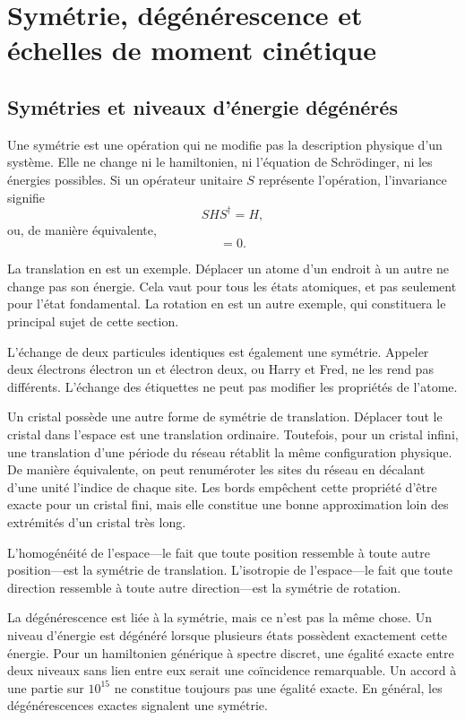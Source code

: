 \chapter{Symétrie, dégénérescence et échelles de moment cinétique}
\providecommand{\ket}[1]{\left\lvert#1\right\rangle}

\section{Symétries et niveaux d’énergie dégénérés}

Une symétrie est une opération qui ne modifie pas la description physique d’un système. Elle ne change ni le hamiltonien, ni l’équation de Schr\"odinger, ni les énergies possibles. Si un opérateur unitaire \(S\) représente l’opération, l’invariance signifie
\begin{equation}
S H S^\dagger=H,
\end{equation}
ou, de manière équivalente,
\begin{equation}
[S,H]=0.
\end{equation}

La translation en est un exemple. Déplacer un atome d’un endroit à un autre ne change pas son énergie. Cela vaut pour tous les états atomiques, et pas seulement pour l’état fondamental. La rotation en est un autre exemple, qui constituera le principal sujet de cette section.

L’échange de deux particules identiques est également une symétrie. Appeler deux électrons électron un et électron deux, ou Harry et Fred, ne les rend pas différents. L’échange des étiquettes ne peut pas modifier les propriétés de l’atome.

Un cristal possède une autre forme de symétrie de translation. Déplacer tout le cristal dans l’espace est une translation ordinaire. Toutefois, pour un cristal infini, une translation d’une période du réseau rétablit la même configuration physique. De manière équivalente, on peut renuméroter les sites du réseau en décalant d’une unité l’indice de chaque site. Les bords empêchent cette propriété d’être exacte pour un cristal fini, mais elle constitue une bonne approximation loin des extrémités d’un cristal très long.

L’homogénéité de l’espace---le fait que toute position ressemble à toute autre position---est la symétrie de translation. L’isotropie de l’espace---le fait que toute direction ressemble à toute autre direction---est la symétrie de rotation.

La dégénérescence est liée à la symétrie, mais ce n’est pas la même chose. Un niveau d’énergie est dégénéré lorsque plusieurs états possèdent exactement cette énergie. Pour un hamiltonien générique à spectre discret, une égalité exacte entre deux niveaux sans lien entre eux serait une coïncidence remarquable. Un accord à une partie sur \(10^{15}\) ne constitue toujours pas une égalité exacte. En général, les dégénérescences exactes signalent une symétrie.

